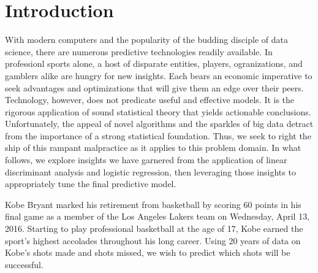 \chapter{Introduction}\label{chap:introduction}
\par
With modern computers and the popularity of the budding disciple of data science, there are numerous predictive technologies readily available.  In professionl sports alone, a host of disparate entities, players, ogranizations, and gamblers alike are hungry for new insights. Each bears an economic imperative to seek advantages and optimizations that will give them an edge over their peers.  Technology, however, does not predicate useful and effective models.  It is the rigorous application of sound statistical theory that yields actionable conclusions.  Unfortunately, the appeal of novel algorithms and the sparkles of big data detract from the importance of a strong statistical foundation.  Thus, we seek to right the ship of this rampant malpractice as it applies to this problem domain.  In what follows, we explore insights we have garnered from the application of linear discriminant analysis and logistic regression, then leveraging those insights to appropriately tune the final predictive model.
\par
Kobe Bryant marked his retirement from basketball by scoring 60 points in his final game as a member of the Los Angeles Lakers team on Wednesday, April 13, 2016. Starting to play professional basketball at the age of 17, Kobe earned the sport’s highest accolades throughout his long career.  Using 20 years of data on Kobe's shots made and shots missed, we wish to predict which shots will be successful.
